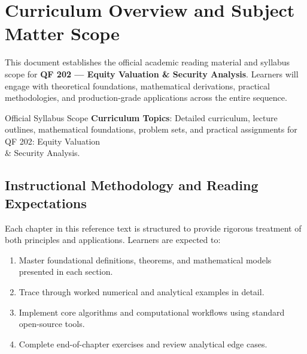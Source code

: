 \section{Curriculum Overview and Subject Matter Scope}

This document establishes the official academic reading material and syllabus scope for \textbf{QF 202 --- Equity Valuation \& Security Analysis}. Learners will engage with theoretical foundations, mathematical derivations, practical methodologies, and production-grade applications across the entire sequence.

\begin{InsightBox}{Official Syllabus Scope}
  \textbf{Curriculum Topics}: Detailed curriculum, lecture outlines, mathematical foundations, problem sets, and practical assignments for QF 202: Equity Valuation \\& Security Analysis.
\end{InsightBox}

\subsection{Instructional Methodology and Reading Expectations}

Each chapter in this reference text is structured to provide rigorous treatment of both principles and applications. Learners are expected to:
\begin{enumerate}
  \item Master foundational definitions, theorems, and mathematical models presented in each section.
  \item Trace through worked numerical and analytical examples in detail.
  \item Implement core algorithms and computational workflows using standard open-source tools.
  \item Complete end-of-chapter exercises and review analytical edge cases.
\end{enumerate}

